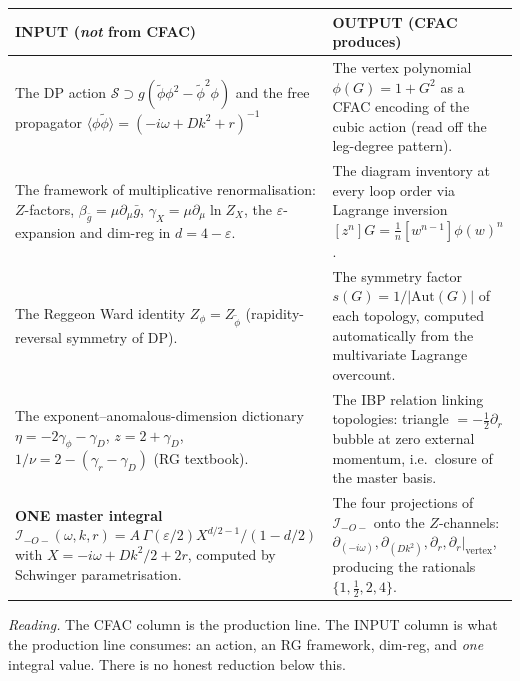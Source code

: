 \documentclass[11pt,a4paper]{article}
\begin{document}
\begin{center}
\renewcommand{\arraystretch}{1.15}
\begin{tabular}{@{}p{8.0cm}p{7.5cm}@{}}
\toprule
\textbf{INPUT} (\emph{not} from CFAC) & \textbf{OUTPUT} (CFAC produces) \\
\midrule
The DP action $\mathcal S \supset g(\widetilde\phi\phi^{2}-\widetilde\phi^{2}\phi)$ and the
free propagator $\langle\phi\widetilde\phi\rangle = (-i\omega+Dk^{2}+r)^{-1}$ &
The vertex polynomial $\phi(G) = 1 + G^{2}$ as a CFAC encoding of the cubic action
(read off the leg-degree pattern). \\[2pt]

The framework of multiplicative renormalisation: $Z$-factors, $\beta_{\bar g}=\mu\partial_{\mu}\bar g$,
$\gamma_{X}=\mu\partial_{\mu}\ln Z_{X}$, the $\varepsilon$-expansion and dim-reg in
$d=4-\varepsilon$. &
The diagram inventory at every loop order via Lagrange inversion
$[z^{n}]G = \tfrac{1}{n}[w^{n-1}]\phi(w)^{n}$. \\[2pt]

The Reggeon Ward identity $Z_{\phi}=Z_{\widetilde\phi}$ (rapidity-reversal symmetry of DP). &
The symmetry factor $s(G) = 1/|\mathrm{Aut}(G)|$ of each topology, computed automatically
from the multivariate Lagrange overcount. \\[2pt]

The exponent--anomalous-dimension dictionary $\eta = -2\gamma_{\phi}-\gamma_{D}$,
$z = 2 + \gamma_{D}$, $1/\nu = 2 - (\gamma_{r}-\gamma_{D})$ (RG textbook). &
The IBP relation linking topologies: triangle $=-\tfrac{1}{2}\partial_{r}\,$bubble at zero
external momentum, i.e.\ closure of the master basis. \\[2pt]

\textbf{ONE master integral} $\mathcal I_{-O-}(\omega,k,r) = A\,\Gamma(\varepsilon/2) X^{d/2-1}/(1-d/2)$
with $X=-i\omega+Dk^{2}/2+2r$, computed by Schwinger parametrisation. &
The four projections of $\mathcal I_{-O-}$ onto the $Z$-channels:
$\partial_{(-i\omega)}, \partial_{(Dk^{2})}, \partial_{r}, \partial_{r}|_{\text{vertex}}$,
producing the rationals $\{1,\tfrac{1}{2},2,4\}$. \\
\bottomrule
\end{tabular}
\end{center}

\noindent\emph{Reading.} The CFAC column is the production line. The INPUT column is what
the production line consumes: an action, an RG framework, dim-reg, and \emph{one} integral
value. There is no honest reduction below this.
\end{document}
